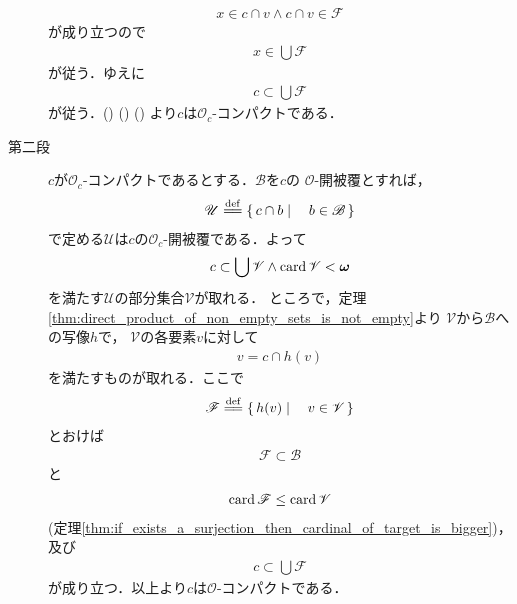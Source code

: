 \begin{sketch}
\begin{description}
				\begin{align}
					x \in c \cap v \wedge c \cap v \in \mathscr{F}
				\end{align}
				が成り立つので
				\begin{align}
					x \in \bigcup \mathscr{F}
				\end{align}
				が従う．ゆえに
				\begin{align}
					c \subset \bigcup \mathscr{F}
					\label{fom:thm_compactness_in_subspace_4}
				\end{align}
				が従う．()
				()
				()
				より$c$は$\mathscr{O}_{c}$-コンパクトである．
				
			\item[第二段]
				$c$が$\mathscr{O}_{c}$-コンパクトであるとする．$\mathscr{B}$を$c$の
				$\mathscr{O}$-開被覆とすれば，
				\begin{align}
					\mathscr{U} \defeq \Set{c \cap b}{b \in \mathscr{B}}
				\end{align}
				で定める$\mathscr{U}$は$c$の$\mathscr{O}_{c}$-開被覆である．よって
				\begin{align}
					c \subset \bigcup \mathscr{V} \wedge \operatorname{card} \mathscr{V} < {\boldsymbol \omega}
				\end{align}
				を満たす$\mathscr{U}$の部分集合$\mathscr{V}$が取れる．
				ところで，定理\ref{thm:direct_product_of_non_empty_sets_is_not_empty}より
				$\mathscr{V}$から$\mathscr{B}$への写像$h$で，
				$\mathscr{V}$の各要素$v$に対して
				\begin{align}
					v = c \cap h(v)
				\end{align}
				を満たすものが取れる．ここで
				\begin{align}
					\mathscr{F} \defeq \Set{h(v)}{v \in \mathscr{V}}
				\end{align}
				とおけば
				\begin{align}
					\mathscr{F} \subset \mathscr{B}
				\end{align}
				と
				\begin{align}
					\operatorname{card} \mathscr{F} \leq \operatorname{card} \mathscr{V}
				\end{align}
				(定理\ref{thm:if_exists_a_surjection_then_cardinal_of_target_is_bigger})，
				及び
				\begin{align}
					c \subset \bigcup \mathscr{F}
				\end{align}
				が成り立つ．以上より$c$は$\mathscr{O}$-コンパクトである．
				\QED
		\end{description}
	\end{sketch}
	
